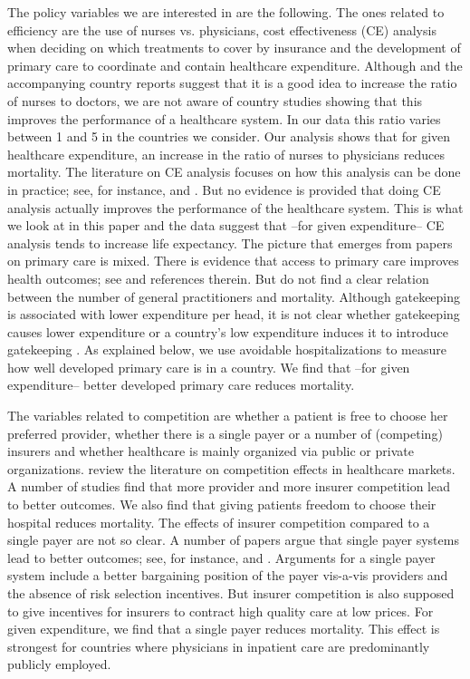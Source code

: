 \documentclass[a4paper,12pt]{article}
\begin{document}
The policy variables we are interested in are the following. The ones related to efficiency are the use of nurses vs. physicians, cost effectiveness (CE) analysis when deciding on which treatments to cover by insurance and the development of primary care to coordinate and contain healthcare expenditure. Although \cite{countryprofileReport} and the accompanying country reports suggest that it is a good idea to increase the ratio of nurses to doctors, we are not aware of country studies showing that this improves the performance of a healthcare system. In our data this ratio varies between 1 and 5 in the countries we consider. Our analysis shows that for given healthcare expenditure, an increase in the ratio of nurses to physicians reduces mortality. The literature on CE analysis focuses on how this analysis can be done in practice; see, for instance, \cite{Drummond2005} and \cite{Gold96e}. But no evidence is provided that doing CE analysis actually improves the performance of the healthcare system. This is what we look at in this paper and the data suggest that --for given expenditure-- CE analysis tends to increase life expectancy. The picture that emerges from papers on primary care is mixed. There is evidence that access to primary care improves health outcomes; see \cite{starfield2005} and references therein. But \cite{AAKVIK20061139} do not find a clear relation between the number of general practitioners and mortality. Although gatekeeping is associated with lower expenditure per head, it is not clear whether gatekeeping causes lower expenditure or a country's low expenditure induces it to introduce gatekeeping \citep{Forrest692}. As explained below, we use avoidable hospitalizations to measure how well developed primary care is in a country. We find that --for given expenditure-- better developed primary care reduces mortality.

The variables related to competition are whether a patient is free to choose her preferred provider, whether there is a single payer or a number of (competing) insurers and whether healthcare is mainly organized via public or private organizations. \cite{NBERw19800} review the literature on competition effects in healthcare markets. A number of studies find that more provider and more insurer competition lead to better outcomes. We also find that giving patients freedom to choose their hospital reduces mortality. The effects of insurer competition compared to a single payer are not so clear. A number of papers argue that single payer systems lead to better outcomes; see, for instance, \cite{BICHAY2020113454} and \cite{OberlanderSinglePayer}. Arguments for a single payer system include a better bargaining position of the payer vis-a-vis providers and the absence of risk selection incentives. But insurer competition is also supposed to give incentives for insurers to contract high quality care at low prices. For given expenditure, we find that a single payer reduces mortality. This effect is strongest for countries where physicians in inpatient care are predominantly publicly employed.
\end{document}
